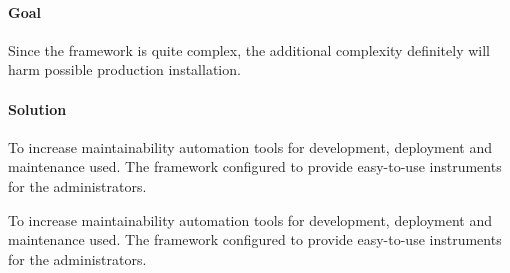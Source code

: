 \paragraph{Goal}\label{goal-4}

Since the framework is quite complex, the additional complexity
definitely will harm possible production installation.

\paragraph{Solution}\label{solution-4}

To increase maintainability automation tools for development, deployment
and maintenance used. The framework configured to provide easy-to-use
instruments for the administrators.

To increase maintainability automation tools for development, deployment
and maintenance used. The framework configured to provide easy-to-use
instruments for the administrators.
